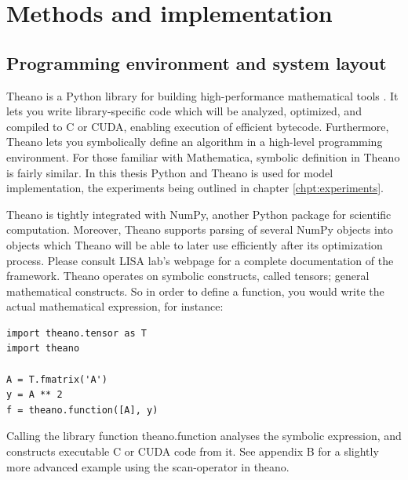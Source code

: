
\chapter{Methods and implementation}\label{chpt:methods}

\section{Programming environment and system layout}

Theano is a Python library for building high-performance mathematical tools \citep{Bergstra2010}. It lets you write library-specific code which will be analyzed, optimized, and compiled to C or CUDA, enabling execution of efficient bytecode. Furthermore, Theano lets you symbolically define an algorithm in a high-level programming environment. For those familiar with Mathematica, symbolic definition in Theano is fairly similar. In this thesis Python and Theano is used for model implementation, the experiments being outlined in chapter \ref{chpt:experiments}.

Theano is tightly integrated with NumPy, another Python package for scientific computation. Moreover, Theano supports parsing of several NumPy objects into objects which Theano will be able to later use efficiently after its optimization process. Please consult LISA lab's webpage \citep{LISA-lab2015a} for a complete documentation of the framework.
Theano operates on symbolic constructs, called tensors; general mathematical constructs. So in order to define a function, you would write the actual mathematical expression, for instance:

\begin{verbatim}
import theano.tensor as T
import theano

A = T.fmatrix('A')
y = A ** 2
f = theano.function([A], y)
\end{verbatim}

Calling the library function theano.function analyses the symbolic expression, and constructs executable C or CUDA code from it. See appendix B for a slightly more advanced example using the scan-operator in theano.

